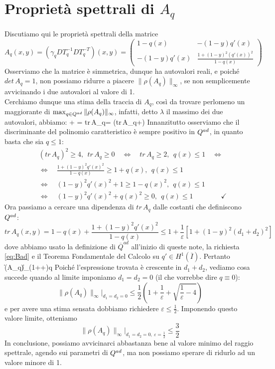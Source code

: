 \section{Proprietà spettrali di $A_q$}
Discutiamo qui le proprietà spettrali della matrice
$$A_q(x,y) = (\gamma_qDT_q^{-1}DT_q^{-T})(x,y) = \begin{pmatrix} 1-q(x) & -(1-y)q'(x) \\ -(1-y)q'(x) & \frac{1+(1-y)^2(q'(x))^2}{1-q(x)}\end{pmatrix}$$
Osserviamo che la matrice è simmetrica, dunque ha autovalori reali, e poiché $det\,A_q=1$, non possiamo ridurre a piacere $\|\rho(A_q)\|_\infty$, se non semplicemente avvicinando i due autovalori al valore di 1.\\
Cerchiamo dunque una stima della traccia di $A_q$, così da trovare perlomeno un maggiorante di $\max_{q\in Q^{ad}}\|\rho(A_q)\|_\infty$, infatti, detto $\lambda$ il massimo dei due autovalori, abbiamo:
\beq
	\lambda +  = tr\,A_q\quad\Rightarrow\quad \lambda = \left(tr\,A_q+\right)
\label{eq:lambda12}
\eeq
Innanzitutto osserviamo che il discriminante del polinomio caratteristico è sempre positivo in $Q^{ad}$, in quanto basta che sia $q\leq1$:
\begin{equation*}\begin{split}
	&(tr\,A_q)^2\geq 4, \ \ tr\,A_q\geq 0 \quad\Leftrightarrow\quad tr\,A_q \geq 2,\ \ q(x)\leq1\quad\Leftrightarrow\\
	&\Leftrightarrow\quad \frac{1+(1-y)^2q'(x)^2}{1-q(x)}\geq 1+q(x),\ \ q(x)\leq1\\
	&\Leftrightarrow\quad (1-y)^2q'(x)^2+1\geq1-q(x)^2,\ \ q(x)\leq1\\
	&\Leftrightarrow\quad (1-y)^2q'(x)^2+q(x)^2\geq 0,\ \ q(x)\leq1\qquad\qquad\checkmark
\end{split}\end{equation*}
Ora passiamo a cercare una dipendenza di $tr\,A_q$ dalle costanti che definiscono $Q^{ad}$:
$$tr\,A_q(x,y) = 1-q(x)+\frac{1+(1-y)^2q'(x)^2}{1-q(x)}\leq1+\frac{1}{\varepsilon}\left[1+(1-y)^2(d_1+d_2)^2\right]$$
dove abbiamo usato la definizione di $\overline{Q}^{ad}$ all'inizio di queste note, la richiesta \eqref{eq:Bad} e il Teorema Fondamentale del Calcolo su $q'\in H^1(\overline{I})$.
Pertanto
\beq
	\|\rho(A_q)\|_\infty\leq{}\left(1++\right)\qquad \forall q\in\Q
\label{eq:rhoinfty}
\eeq
Poiché l'espressione trovata è crescente in $d_1+d_2$, vediamo cosa succede quando al limite imponiamo $d_1=d_2=0$ (il che vorrebbe dire $q\equiv0$):
$$\|\rho(A_q)\|_\infty|_{d_1=d_2=0}\leq\frac{1}{2}\left(1+\frac{1}{\varepsilon}+\sqrt{\frac{1}{\varepsilon}-4}\right)$$
e per avere una stima sensata dobbiamo richiedere $\varepsilon\leq\frac{1}{2}$. Imponendo questo valore limite, otteniamo
$$\|\rho(A_q)\|_\infty|_{d_1=d_2=0,\ \varepsilon=\frac{1}{2}}\leq\frac{3}{2}$$
In conclusione, possiamo avvicinarci abbastanza bene al valore minimo del raggio spettrale, agendo sui parametri di $Q^{ad}$, ma non possiamo sperare di ridurlo ad un valore minore di 1.



